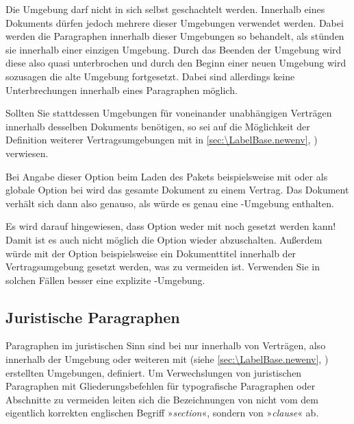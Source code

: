 Die Umgebung  darf nicht in sich
selbst geschachtelt werden. Innerhalb eines Dokuments dürfen jedoch mehrere
dieser Umgebungen verwendet werden. Dabei werden die Paragraphen innerhalb
dieser Umgebungen so behandelt, als stünden sie innerhalb einer einzigen
Umgebung. Durch das Beenden der Umgebung wird diese also quasi
unterbrochen und durch den Beginn einer neuen Umgebung wird sozusagen die alte
Umgebung fortgesetzt. Dabei sind allerdings keine Unterbrechungen innerhalb
eines Paragraphen möglich.

Sollten Sie stattdessen Umgebungen für voneinander unabhängigen Verträgen
innerhalb desselben Dokuments benötigen, so sei auf die Möglichkeit der
Definition weiterer Vertragsumgebungen mit
 in
\autoref{sec:\LabelBase.newenv},
) verwiesen.%
\EndIndexGroup

\begin{Declaration}
\end{Declaration}
Bei Angabe dieser Option beim Laden des Pakets beispielsweise mit
%
 oder als globale Option bei
%
 wird das gesamte Dokument
zu einem Vertrag. Das Dokument verhält sich dann also genauso, als würde es
genau eine -Umgebung enthalten.

Es wird darauf hingewiesen, dass Option 
weder mit  noch
 gesetzt werden kann!  Damit ist es auch
nicht möglich die Option wieder abzuschalten. Außerdem würde mit der Option
beispielsweise ein Dokumenttitel innerhalb der Vertragsumgebung
gesetzt werden, was zu vermeiden ist. Verwenden Sie in solchen Fällen
besser eine explizite -Umgebung.%
\EndIndexGroup


\subsection{Juristische Paragraphen}
\label{sec:scrjura.clause}
\BeginIndexGroup
{} 

Paragraphen im juristischen Sinn sind bei  nur innerhalb von
Verträgen, also innerhalb der Umgebung  oder
weiteren mit  (siehe
\autoref{sec:\LabelBase.newenv},
) erstellten Umgebungen,
definiert. Um Verwechslungen von juristischen Paragraphen
mit Gliederungsbefehlen für typografische Paragraphen oder Abschnitte zu
vermeiden leiten sich die Bezeichnungen von  nicht vom dem
eigentlich korrekten englischen Begriff »\emph{section}«, sondern von
»\emph{clause}« ab.

